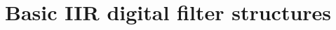 \documentclass[../../main/main.tex]{subfiles}
\begin{document}

\section{Basic IIR digital filter structures}
\end{document}
